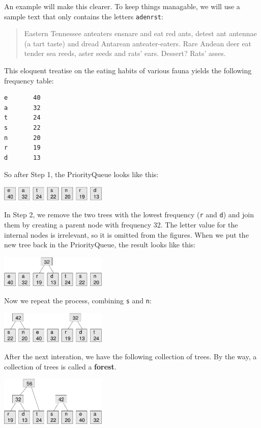 \documentclass[12pt]{book}
\theoremstyle{exercise}
\begin{document}
An example will make this clearer.  To keep things managable,
we will use a sample text that only contains the letters
{\tt adenrst}:

\begin{quote}
Eastern Tennessee anteaters ensnare and eat red ants, detest ant
antennae (a tart taste) and dread Antarean anteater-eaters.
Rare Andean deer eat tender sea reeds, aster seeds and rats'
ears.  Dessert?  Rats' asses.
\end{quote}

This eloquent treatise on the eating habits of various fauna
yields the following frequency table:

\begin{verbatim}
e       40
a       32
t       24
s       22
n       20
r       19
d       13
\end{verbatim}

So after Step 1, the PriorityQueue looks like this:

\includegraphics[width=2.0in]{figs/huff0.pdf}

In Step 2, we remove the two trees with the lowest frequency
({\tt r} and {\tt d}) and join them by creating a parent node
with frequency 32.  The letter value for the internal nodes is
irrelevant, so it is omitted from the figures.  When we put the
new tree back in the PriorityQueue, the result looks like this:

\includegraphics[width=2.0in]{figs/huff1.pdf}

Now we repeat the process, combining {\tt s} and {\tt n}:

\includegraphics[width=2.0in]{figs/huff2.pdf}

After the next interation, we have the following collection of
trees.  By the way, a collection of trees is called a {\bf forest}.


\includegraphics[width=2.0in]{figs/huff3.pdf}
\end{document}
